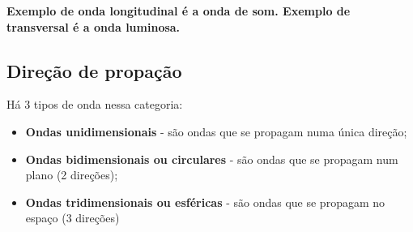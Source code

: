 \documentclass[12pt]{extarticle}
\newcommand{\<}{\langle}
\renewcommand{\>}{\rangle}
\theoremstyle{definition}
\begin{document}
\textbf{Exemplo de onda longitudinal é a onda de som. Exemplo de transversal é a onda luminosa.}

\subsection{Direção de propação}
Há 3 tipos de onda nessa categoria:
\begin{itemize}
    \item \textbf{Ondas unidimensionais} - são ondas que se propagam numa única direção;
    \item \textbf{Ondas bidimensionais ou circulares} - são ondas que se propagam num plano (2 direções);
    \item \textbf{Ondas tridimensionais ou esféricas} - são ondas que se propagam no espaço (3 direções)
\end{itemize}
\end{document}
